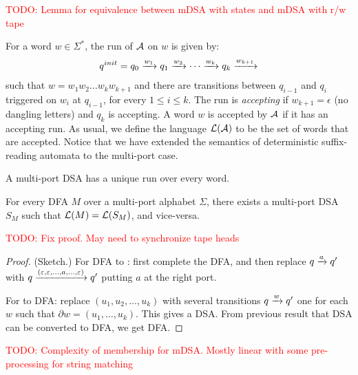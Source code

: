 
\textcolor{red}{TODO: Lemma for equivalence between mDSA with states and mDSA with r/w tape}

 For a word $w \in \Sigma^*$, the run of \mdsa $\mathcal{A}$ on $w$ is given by:
 \begin{align*}
   q^{init} = q_0 \xrightarrow{w_1} q_1 \xrightarrow{w_2} \cdots \xrightarrow{w_{k}} q_k \xrightarrow{w_{k+1}}
 \end{align*}
 such that $w = w_1 w_2 \dots w_kw_{k+1}$ and there are transitions
 between $q_{i-1}$ and $q_i$ triggered on $w_i$ at $q_{i-1}$, for
 every $1 \le i \le k$. The run is \emph{accepting} if
 $w_{k+1} = \epsilon$ (no dangling letters) and $q_k$ is accepting. A
 word $w$ is accepted by \mdsa $\mathcal{A}$ if it has an accepting run. As
 usual, we define the language $\mathcal{L}(\mathcal{A})$ to be the set of words that
 are accepted. Notice that we have extended the semantics of
 deterministic suffix-reading automata to the multi-port
 case. %

\begin{lemma}
 A multi-port DSA has a unique run over every word.
\end{lemma}%

\begin{theorem}
 For every DFA $M$ over a multi-port alphabet $\Sigma$, there exists
 a multi-port DSA $S_M$ such that $\mathcal{L}(M) = \mathcal{L}(S_M)$, and
 vice-versa.
\end{theorem}

\textcolor{red}{TODO: Fix proof. May need to synchronize tape heads}

\begin{proof} (Sketch.) For DFA to \mdsa: first complete the DFA, and
 then replace $q \xrightarrow{a} q'$ with
 $q \xrightarrow{(\varepsilon, \varepsilon, \dots, a, \dots, \varepsilon)} q'$ putting $a$ at the right
 port.%

 For \mdsa to DFA: replace $(u_1, u_2, \dots, u_k)$ with several
 transitions $q \xrightarrow{w} q'$ one for each $w$ such that
 $\partial w = (u_1, \dots, u_k)$. This gives a DSA. From previous
 result that DSA can be converted to DFA, we get DFA.%


\end{proof}%

\textcolor{red}{TODO: Complexity of membership for mDSA. Mostly linear with some pre-processing for string matching}



